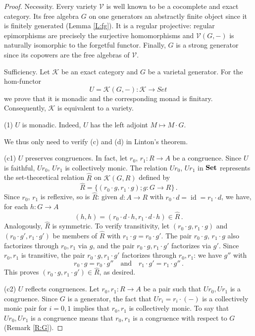 \documentclass[12pt,amstex,leqno]{amsart}
\newcommand\Set{\operatorname{\bf Set}}
\newcommand{\id}{\operatorname{id}}
\newcommand\ck{\mathcal {K}}
\newcommand\cv{\mathcal {V}}
\theoremstyle{definition}
\numberwithin{equation}{section}
\begin{document}
\begin{proof}
Necessity. Every variety $\cv$ is well known to be a cocomplete and  exact category. Its free algebra $G$ on one generators an abstractly finite object since it is finitely generated (Lemma \ref{L:fg}). It is a regular  projective: regular epimorphisms are precisely the surjective homomorphisms and $\cv(G,-)$ is naturally isomorphic to the forgetful functor. Finally, $G$ is a strong generator since its copowers are  the free algebras of $\cv$.

Sufficiency. Let $\ck$ be an exact category and $G$  be a varietal generator. For the hom-functor
$$
U =\ck(G,-) \colon \ck \to  Set\,
$$
we prove that it is monadic and the corresponding monad is finitary. Consequently, $\ck$ is equivalent to a variety.

(1) $U$ is monadic. Indeed, $U$ has the left adjoint $M\mapsto M\cdot G$.

We thus only need to verify (c) and (d) in Linton's theorem.

(c1) $U$ preserves congruences. In fact, let $r_0$, $r_1\colon R\to A$ be a congruence. Since $U$ is faithful, $Ur_0$, $Ur_1$ is collectively monic. The relation $Ur_0$, $Ur_1$ in $\Set$ represents the set-theoretical relation $\hat R$ on $\ck(G,R)$ defined  by
$$
\hat R =\big\{(r_0\cdot g, r_1\cdot g); g\colon G\to R\big\}\,.
$$
Since $r_0$, $r_1$ is reflexive, so is $\hat R$: given $d\colon A\to R$ with $r_0\cdot d=\id=r_1\cdot d$, we have, for each $h\colon G\to A$
$$
(h,h) = (r_0 \cdot d\cdot h, r_1\cdot d\cdot h)\in \hat R\,.
$$
Analogously, $\hat R$ is symmetric. To verify  transitivity, let $(r_0\cdot g, r_1\cdot g)$ and 
$(r_0\cdot g', r_1\cdot g')$ be members of $\hat R$ with $r_1\cdot g = r_0\cdot g'$. The pair $r_0\cdot g$, $r_1\cdot g$ also factorizes through $r_0, r_1$ via $g$, and the pair $r_0\cdot g, r_1\cdot g'$ factorizes via $g'$. Since  $r_0, r_1$ is transitive, the pair $r_0\cdot g, r_1\cdot g'$ factorizes through $r_0, r_1$: we have $g''$ with
$$
r_0 \cdot g= r_0 \cdot g''\quad \mbox{and} \quad r_1\cdot g'=r_1\cdot g''\,.
$$
This proves $(r_0\cdot g, r_1\cdot g') \in \hat R$, as desired.

(c2) $U$ reflects congruences. Let $r_0, r_1\colon R\to A$ be a pair such that $U r_0, Ur_1$ is a congruence. Since $G$ is a generator, the fact that $Ur_i = r_i\cdot (-)$ is a collectively monic pair for $i=0,1$ implies that $r_0, r_1$ is collectively monic. To say that $Ur_0, Ur_1$ is a congruence means that $r_0, r_1$ is a congruence with respect to $G$ (Remark \ref{R:G}).


\end{proof}
\end{document}
